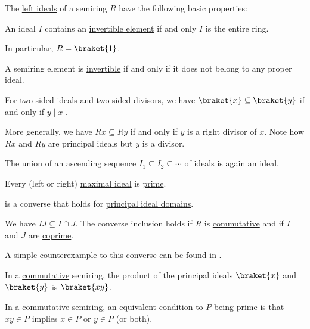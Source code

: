 \begin{proposition}\label{thm:def:semiring_ideal}
  The \hyperref[def:semiring_ideal]{left ideals} of a semiring \( R \) have the following basic properties:
  \begin{thmenum}
     An ideal \( I \) contains an \hyperref[def:divisibility/invertible]{invertible element} if and only \( I \) is the entire ring.

    In particular, \( R = \braket{ 1 } \).

     A semiring element is \hyperref[def:divisibility/invertible]{invertible} if and only if it does not belong to any proper ideal.

     For two-sided ideals and \hyperref[def:divisibility]{two-sided divisors}, we have \( \braket{ x } \subseteq \braket{ y } \) if and only if \( y \mid x \) .

    More generally, we have \( Rx \subseteq Ry \) if and only if \( y \) is a right divisor of \( x \). Note how \( Rx \) and \( Ry \) are  principal ideals but \( y \) is a  divisor.

     The union of an \hyperref[def:order_function/ascending]{ascending sequence} \( I_1 \subseteq I_2 \subseteq \cdots \) of ideals is again an ideal.

     Every (left or right) \hyperref[def:semiring_ideal/maximal]{maximal ideal} is \hyperref[def:semiring_ideal/prime]{prime}.

     is a converse that holds for \hyperref[def:principal_ideal_domain]{principal ideal domains}.

     We have \( IJ \subseteq I \cap J \). The converse inclusion holds if \( R \) is \hyperref[def:semiring/commutative]{commutative} and if \( I \) and \( J \) are \hyperref[def:semiring_ideal/coprime]{coprime}.

    A simple counterexample to this converse can be found in .

     In a \hyperref[def:semiring/commutative]{commutative} semiring, the product of the principal ideals \( \braket{x} \) and \( \braket{y} \) is \( \braket{xy} \).

     In a commutative semiring, an equivalent condition to \( P \) being \hyperref[def:semiring_ideal/prime]{prime} is that \( xy \in P \) implies \( x \in P \) or \( y \in P \) (or both).
  \end{thmenum}
\end{proposition}
